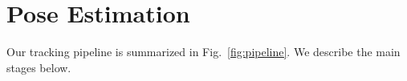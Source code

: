 \documentclass{egpubl}
\begin{document}
\section{Pose Estimation}

Our tracking pipeline is summarized in Fig.~\ref{fig:pipeline}. We describe the main stages below.
\end{document}

